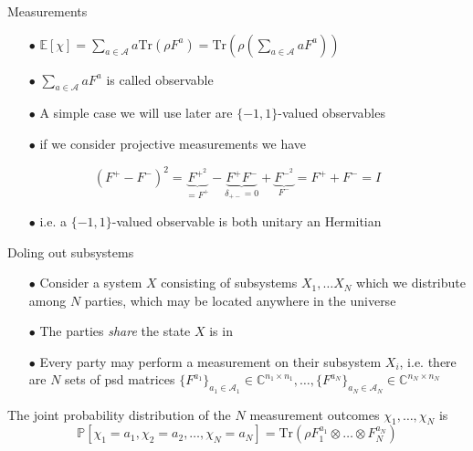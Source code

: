 \begin{frame}{Measurements}
\begin{itemize}
    \item[$\bullet$] $\mathbb{E} [\chi ] = \sum_{a \in \mathcal{A}} a \text{Tr} ( \rho F^a ) =  \text{Tr} ( \rho ( \sum_{a \in \mathcal{A}} a F^a))$
    \item[$\bullet$] $\sum_{a \in \mathcal{A}} aF^a$ is called observable
    \item[$\bullet$] A simple case we will use later are $\{ -1, 1 \}$-valued observables
    \item[$\bullet$] if we consider projective measurements we have
\end{itemize}
    \begin{equation*}
(F^+-F^-)^2 = \underbrace{F^{+^2}}_{= F^+}- \underbrace{F^+F^-}_{\delta_{+-}=0} + \underbrace{F^{-^2}}_{F^-} = F^+ + F^- = I
\end{equation*}
\begin{itemize}
    \item[$\bullet$] i.e. a $\{ -1, 1 \}$-valued observable is both unitary an Hermitian 
\end{itemize}

\end{frame}

\begin{frame}{Doling out subsystems}
\begin{itemize}
    \item[$\bullet$] Consider a system $X$ consisting of subsystems $X_1, \dots X_N$ which we distribute among $N$ parties, which may be located anywhere in the universe
    \item[$\bullet$] The parties \emph{share} the state $X$ is in
    \item[$\bullet$] Every party may perform a measurement on their subsystem $X_i$, i.e. there are $N$ sets of psd matrices $\{F^{a_1} \}_{a_1 \in \mathcal{A}_1} \in \mathbb{C}^{n_1 \times n_1}, \dots , \{F^{a_N} \}_{a_N \in \mathcal{A}_N} \in \mathbb{C}^{n_N \times n_N} $
\end{itemize}
    
\end{frame}

\begin{frame}{}
    The joint probability distribution of the $N$ measurement outcomes $\chi_1 , \dots , \chi_N$ is 
\begin{equation*}
\mathbb{P}\left[ \chi_1 = a_1, \chi_2 = a_2, \dots , \chi_N = a_N \right] = \text{Tr}(\rho F_1^{a_1} \otimes \dots \otimes F_N^{a_N}) 
\end{equation*}
\end{frame}

